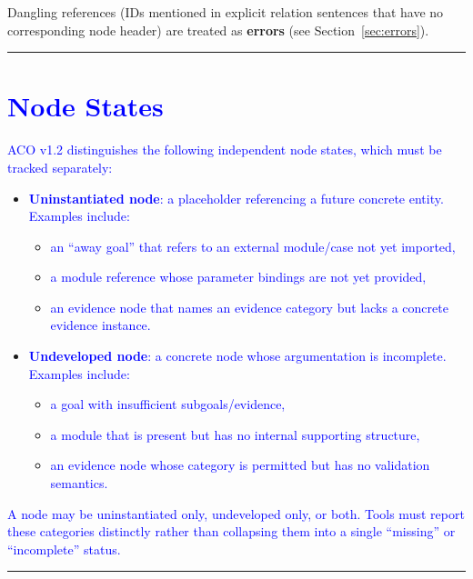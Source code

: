 \documentclass[11pt]{article}
\begin{document}
Dangling references (IDs mentioned in explicit relation sentences that have no corresponding node header) are treated as \textbf{errors} (see Section~\ref{sec:errors}).


\bigskip
\hrule
\bigskip


\section{\textcolor{blue}{Node States}}

\textcolor{blue}{ACO v1.2 distinguishes the following independent node states, which must be tracked separately:}

\begin{itemize}[leftmargin=2em]
  \item \textcolor{blue}{\textbf{Uninstantiated node}: a placeholder referencing a future concrete entity. Examples include:}
  \begin{itemize}[leftmargin=1.5em]
    \item \textcolor{blue}{an ``away goal'' that refers to an external module/case not yet imported,}
    \item \textcolor{blue}{a module reference whose parameter bindings are not yet provided,}
    \item \textcolor{blue}{an evidence node that names an evidence category but lacks a concrete evidence instance.}
  \end{itemize}

  \item \textcolor{blue}{\textbf{Undeveloped node}: a concrete node whose argumentation is incomplete. Examples include:}
  \begin{itemize}[leftmargin=1.5em]
    \item \textcolor{blue}{a goal with insufficient subgoals/evidence,}
    \item \textcolor{blue}{a module that is present but has no internal supporting structure,}
    \item \textcolor{blue}{an evidence node whose category is permitted but has no validation semantics.}
  \end{itemize}
\end{itemize}

\textcolor{blue}{A node may be uninstantiated only, undeveloped only, or both. Tools must report these categories distinctly rather than collapsing them into a single ``missing'' or ``incomplete'' status.}


\bigskip
\hrule
\bigskip
\end{document}
